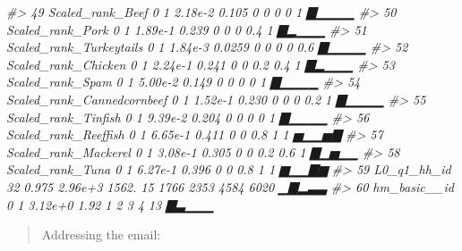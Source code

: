 \documentclass[]{article}
\newenvironment{Shaded}{\begin{snugshade}}{\end{snugshade}}
\newcommand{\CommentTok}[1]{\textcolor[rgb]{0.56,0.35,0.01}{\textit{#1}}}
\begin{document}
\begin{Shaded}
\begin{Highlighting}[]
\CommentTok{#> 49 Scaled_rank_Beef                                                0       1       2.18e-2      0.105          0           0           0           0           1    ▇▁▁▁▁}
\CommentTok{#> 50 Scaled_rank_Pork                                                0       1       1.89e-1      0.239          0           0           0           0.4         1    ▇▂▁▁▁}
\CommentTok{#> 51 Scaled_rank_Turkeytails                                         0       1       1.84e-3      0.0259         0           0           0           0           0.6  ▇▁▁▁▁}
\CommentTok{#> 52 Scaled_rank_Chicken                                             0       1       2.24e-1      0.241          0           0           0.2         0.4         1    ▇▂▁▁▁}
\CommentTok{#> 53 Scaled_rank_Spam                                                0       1       5.00e-2      0.149          0           0           0           0           1    ▇▁▁▁▁}
\CommentTok{#> 54 Scaled_rank_Cannedcornbeef                                      0       1       1.52e-1      0.230          0           0           0           0.2         1    ▇▁▁▁▁}
\CommentTok{#> 55 Scaled_rank_Tinfish                                             0       1       9.39e-2      0.204          0           0           0           0           1    ▇▁▁▁▁}
\CommentTok{#> 56 Scaled_rank_Reeffish                                            0       1       6.65e-1      0.411          0           0           0.8         1           1    ▅▁▁▅▇}
\CommentTok{#> 57 Scaled_rank_Mackerel                                            0       1       3.08e-1      0.305          0           0           0.2         0.6         1    ▇▁▅▁▁}
\CommentTok{#> 58 Scaled_rank_Tuna                                                0       1       6.27e-1      0.396          0           0           0.8         1           1    ▆▁▁▇▆}
\CommentTok{#> 59 L0_q1_hh_id                                                    32       0.975   2.96e+3   1562.            15        1766        2353        4584        6020    ▁▇▂▃▃}
\CommentTok{#> 60 hm_basic__id                                                    0       1       3.12e+0      1.92           1           2           3           4          13    ▇▃▁▁▁}
\end{Highlighting}
\end{Shaded}

\begin{quote}
Addressing the email:
\end{quote}
\end{document}
